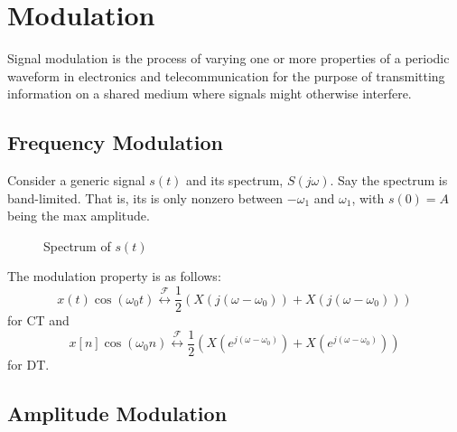 \section{Modulation}
Signal modulation is the process of varying one or more properties of
a periodic waveform in electronics and telecommunication for the
purpose of transmitting information on a shared medium where signals might
otherwise interfere.
\subsection{Frequency Modulation}
Consider a generic signal $s(t)$ and its spectrum, $S(j\omega)$. Say
the spectrum is band-limited. That is, its is only nonzero between
$-\omega_1$ and $\omega_1$, with $s(0) = A$ being the max amplitude.
\begin{figure}
    \caption{Spectrum of $s(t)$}
\end{figure}

The modulation property is as follows:
\begin{equation}
    x(t)\cos(\omega_0 t) \overset{\mathcal{F}}{\leftrightarrow} \frac{1}{2}\left( X(j(\omega-\omega_0)) + X(j(\omega-\omega_0))\right)
\end{equation}
for CT and
\begin{equation}
    x[n]\cos(\omega_0 n)  \overset{\mathcal{F}}{\leftrightarrow}  \frac{1}{2}\left( X(e^{j(\omega-\omega_0)}) + X(e^{j(\omega-\omega_0)})\right)
\end{equation}
for DT.


\subsection{Amplitude Modulation}